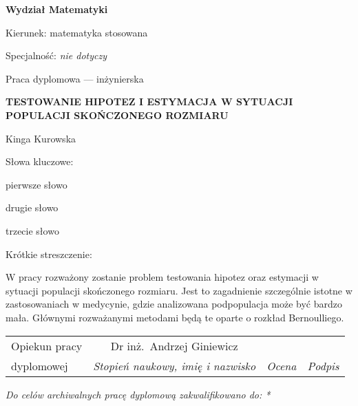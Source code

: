 \documentclass[12pt,a4paper,twoside]{book}
\begin{document}
\begin{titlepage}
\noindent\textbf{\large Wydział Matematyki}
\par\medskip\noindent
Kierunek: matematyka stosowana
\par\noindent
Specjalność: \textit{nie dotyczy}
\vspace*{36pt}
\begin{center}
\LARGE Praca dyplomowa --- inżynierska
\end{center}
\vspace*{24pt}
\begin{center}
\uppercase{\Large\bfseries%
Testowanie hipotez i estymacja w sytuacji populacji skończonego rozmiaru}
\end{center}
\vspace*{12pt}
\begin{center}
Kinga Kurowska
\end{center}
\vspace*{12pt}
\begin{flushright}
Słowa kluczowe:\par\noindent
pierwsze słowo\par\noindent
drugie słowo\par\noindent
trzecie słowo\par\noindent
\end{flushright}
\begin{flushleft}
Krótkie streszczenie:\par
W pracy rozważony zostanie problem testowania hipotez oraz estymacji w sytuacji populacji skończonego rozmiaru. Jest to zagadnienie szczególnie istotne w zastosowaniach w medycynie, gdzie analizowana podpopulacja może być bardzo mała. Głównymi rozważanymi metodami będą te oparte o rozkład Bernoulliego.
\smallskip
\end{flushleft}
\begin{tabularx}{\textwidth}{|l|c|X|X|}
\hline
{\footnotesize Opiekun pracy} & {\small Dr inż.\ Andrzej Giniewicz} &  &  \\
\cline{2-4}
{\footnotesize dyplomowej} & \textit{\footnotesize Stopień naukowy, imię i nazwisko} & \textit{\footnotesize Ocena} & \textit{\footnotesize Podpis} \\
\hline
\end{tabularx}
\smallskip
\begin{flushleft}
\small\itshape
Do celów archiwalnych pracę dyplomową zakwalifikowano do: *
\begin{compactenum}

\end{compactenum}
\end{flushleft}
\end{titlepage}
\end{document}
